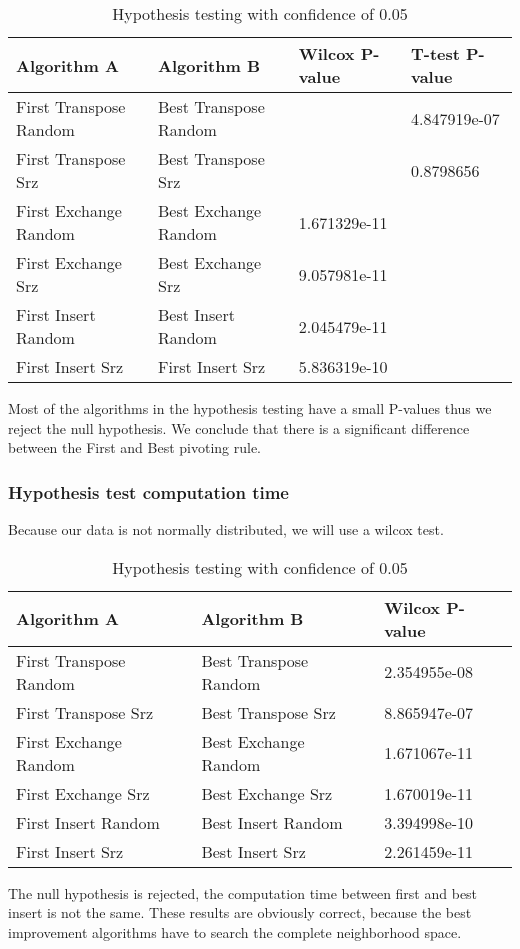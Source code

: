 \documentclass[]{article}
\begin{document}
	
	\begin{table}[H]
		\centering
		\caption{Hypothesis testing with confidence of 0.05}
		\label{tab:table1}
		\begin{tabular}{ll{|}ll}
			\toprule
			Algorithm A & Algorithm B & Wilcox P-value & T-test P-value\\
			\midrule
			First Transpose Random &Best Transpose Random&&\color{OliveGreen}4.847919e-07\\ 
			First Transpose Srz&Best Transpose Srz&&\color{Red}0.8798656\\
			First Exchange Random&Best Exchange Random&\color{OliveGreen}1.671329e-11&\\
			First Exchange Srz&Best Exchange Srz&\color{OliveGreen}9.057981e-11&\\
			First Insert Random&Best Insert Random&\color{OliveGreen}2.045479e-11&\\ 
			First Insert Srz&First Insert Srz&\color{OliveGreen}5.836319e-10&\\
			\bottomrule
		\end{tabular}
	\end{table}
	
	Most of the algorithms in the hypothesis testing have a small P-values thus we reject the null hypothesis.
	We conclude that there is a significant difference between the First and Best pivoting rule.
	
	
	\subsubsection{Hypothesis test computation time}
	Because our data is not normally distributed, we will use a wilcox test.
	
	
	\begin{table}[H]
		\centering
		\caption{Hypothesis testing with confidence of 0.05}
		\label{tab:table1}
		\begin{tabular}{ll{|}l}
			\toprule
			Algorithm A & Algorithm B & Wilcox P-value\\
			\midrule
			First Transpose Random &Best Transpose Random&\color{OliveGreen}2.354955e-08\\ 
			First Transpose Srz&Best Transpose Srz&\color{OliveGreen}8.865947e-07\\
			First Exchange Random&Best Exchange Random&\color{OliveGreen}1.671067e-11\\
			First Exchange Srz&Best Exchange Srz&\color{OliveGreen}1.670019e-11\\
			First Insert Random&Best Insert Random&\color{OliveGreen}3.394998e-10\\ 
			First Insert Srz&Best Insert Srz&\color{OliveGreen}2.261459e-11\\
			\bottomrule
		\end{tabular}
	\end{table}
	The null hypothesis is rejected, the computation time between first and best insert is not the same.
	These results are obviously correct, because the best improvement algorithms have to search the complete neighborhood space.
	
\end{document}
